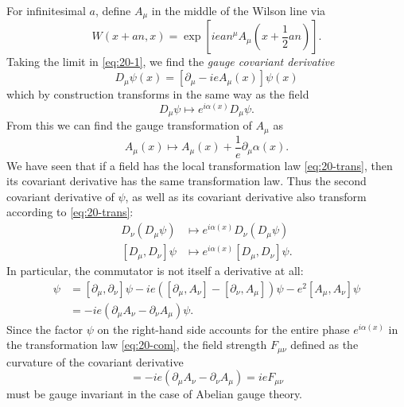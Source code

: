 For infinitesimal $a$, define $A_{\mu}$ in the middle of the Wilson line via
\begin{equation}
  \label{eq:20-infwilson}
  W(x + an, x) = \exp[i e a n^{\mu} A_{\mu} (x + \frac{1}{2} an)].
\end{equation}
Taking the limit in \eqref{eq:20-1}, we find the \emph{gauge covariant derivative}
\begin{equation}
  D_{\mu} \psi(x) = [\partial_{\mu} - i e A_{\mu}(x)] \psi(x)
\end{equation}
which by construction transforms in the same way as the field
\begin{equation}
  D_{\mu} \psi \mapsto e^{i \alpha(x)} D_{\mu} \psi.
\end{equation}
From this we can find the gauge transformation of $A_{\mu}$ as
\begin{equation}
  \label{eq:20-gaugetransform}
  A_{\mu}(x) \mapsto A_{\mu}(x) + \frac{1}{e} \partial_{\mu} \alpha(x).
\end{equation}
We have seen that if a field has the local transformation law \eqref{eq:20-trans}, then its covariant derivative has the same transformation law. Thus the second covariant derivative of $\psi$, as well as its covariant derivative also transform according to \eqref{eq:20-trans}:
\begin{align}
  D_{\nu} (D_{\mu} \psi) &\mapsto e^{i \alpha(x)} D_{\nu}(D_{\mu} \psi) \\
  [D_{\mu}, D_{\nu}] \psi &\mapsto e^{i \alpha(x)} [D_{\mu}, D_{\nu}] \psi. \label{eq:20-com}
\end{align}
In particular, the commutator is not itself a derivative at all:
\begin{align}
  [D_{\mu}, D_{\nu}] \psi &= [\partial_{\mu}, \partial_{\nu}] \psi - i e ([\partial_{\mu}, A_{\nu}] - [\partial_{\nu}, A_{\mu}]) \psi - e^2 [A_{\mu}, A_{\nu}] \psi \\
			  &= -ie (\partial_{\mu} A_{\nu} - \partial_{\nu} A_{\mu}) \psi.
\end{align}
Since the factor $\psi$ on the right-hand side accounts for the entire phase $e^{i \alpha(x)}$ in the transformation law \eqref{eq:20-com}, the field strength $F_{\mu\nu}$ defined as the curvature of the covariant derivative
\begin{equation}
  [D_{\mu}, D_{\nu}] = -i e (\partial_{\mu} A_{\nu} - \partial_{\nu} A_{\mu}) = i e F_{\mu\nu}
\end{equation}
must be gauge invariant in the case of Abelian gauge theory.

